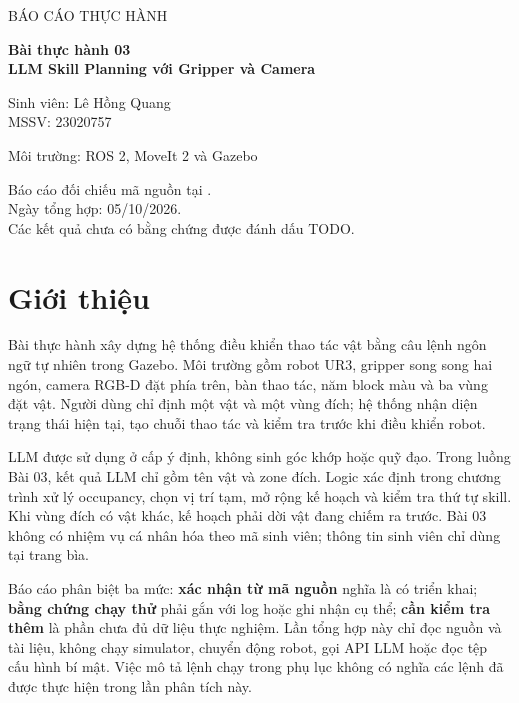 \documentclass[12pt,a4paper]{article}
\begin{document}
\begin{titlepage}
\centering
\vspace*{2cm}
{\Large BÁO CÁO THỰC HÀNH\par}
\vspace{1cm}
{\LARGE\bfseries Bài thực hành 03\\[.5em]LLM Skill Planning với Gripper và Camera\par}
\vspace{2cm}
{\large Sinh viên: Lê Hồng Quang\\[.5em]MSSV: 23020757\par}
\vspace{1.5cm}
{\large Môi trường: ROS 2, MoveIt 2 và Gazebo\par}
\vfill
{\small Báo cáo đối chiếu mã nguồn tại .\\
Ngày tổng hợp: 05/10/2026.\\
Các kết quả chưa có bằng chứng được đánh dấu TODO.\par}
\end{titlepage}
\tableofcontents\newpage

\section{Giới thiệu}
Bài thực hành xây dựng hệ thống điều khiển thao tác vật bằng câu lệnh ngôn ngữ tự nhiên trong Gazebo. Môi trường gồm robot UR3, gripper song song hai ngón, camera RGB-D đặt phía trên, bàn thao tác, năm block màu và ba vùng đặt vật. Người dùng chỉ định một vật và một vùng đích; hệ thống nhận diện trạng thái hiện tại, tạo chuỗi thao tác và kiểm tra trước khi điều khiển robot.

LLM được sử dụng ở cấp ý định, không sinh góc khớp hoặc quỹ đạo. Trong luồng Bài 03, kết quả LLM chỉ gồm tên vật và zone đích. Logic xác định trong chương trình xử lý occupancy, chọn vị trí tạm, mở rộng kế hoạch và kiểm tra thứ tự skill. Khi vùng đích có vật khác, kế hoạch phải dời vật đang chiếm ra trước. Bài 03 không có nhiệm vụ cá nhân hóa theo mã sinh viên; thông tin sinh viên chỉ dùng tại trang bìa.

Báo cáo phân biệt ba mức: \textbf{xác nhận từ mã nguồn} nghĩa là có triển khai; \textbf{bằng chứng chạy thử} phải gắn với log hoặc ghi nhận cụ thể; \textbf{cần kiểm tra thêm} là phần chưa đủ dữ liệu thực nghiệm. Lần tổng hợp này chỉ đọc nguồn và tài liệu, không chạy simulator, chuyển động robot, gọi API LLM hoặc đọc tệp cấu hình bí mật. Việc mô tả lệnh chạy trong phụ lục không có nghĩa các lệnh đã được thực hiện trong lần phân tích này.
\end{document}
